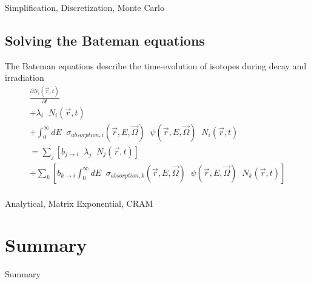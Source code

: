 \documentclass{beamer}
\begin{document}
    \begin{frame}{Simplification, Discretization, Monte Carlo}
    \end{frame}

\subsection{Solving the Bateman equations}

    \begin{frame}{The Bateman equations describe the time-evolution of isotopes during decay and irradiation}
        \begin{equation*}
            \begin{split}
                \frac{\partial N_i(\vec r, t)}{\partial t} \\
                + \lambda_i \; \; N_i(\vec r, t) \\
                + \int_0^\infty \! \! \! \! dE \; \; \sigma_{absorption,i} ( \vec r, E, \vec\Omega) \; \; \psi(\vec r, E, \vec \Omega) \; \; N_i(\vec r, t) \\
                = \sum_j \left[ b_{j \rightarrow i} \; \; \lambda_j \; \; N_j(\vec r, t) \right] \\
                + \sum_k \left[ b_{k \rightarrow i} \int_0^\infty \! \! \! \! dE \; \; \sigma_{absorption,k} ( \vec r, E, \vec\Omega) \; \; \psi(\vec r, E, \vec \Omega) \; \; N_k(\vec r, t) \right] \\
            \end{split}
        \end{equation*}
    \end{frame}

    \begin{frame}{Analytical, Matrix Exponential, CRAM}
    \end{frame}

\section*{Summary}

    \begin{frame}{Summary}
    \end{frame}
\end{document}

